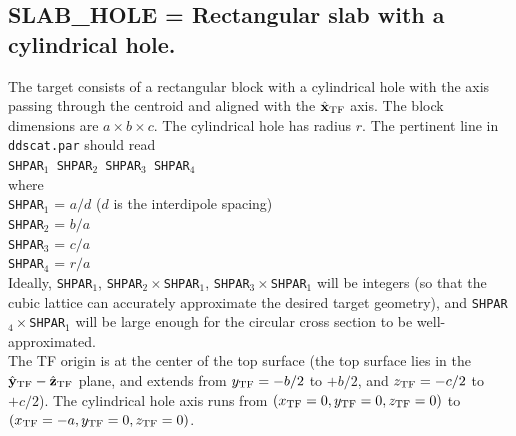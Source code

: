 \subsection{ SLAB\_HOLE = Rectangular slab with a cylindrical hole.
            \label{sec:SLAB_HOLE}}
        The target consists of a rectangular block with a cylindrical
        hole with the axis passing through the centroid and aligned
        with the $\hat{\bf x}_{\rm TF}$ axis.
        The block dimensions are 
        $a\times b\times c$.
        The cylindrical hole has radius $r$. 
        The pertinent line in {\tt ddscat.par} should read\\
        {\tt SHPAR$_1$ SHPAR$_2$ SHPAR$_3$ SHPAR$_4$}\\
        where\\
        {\tt SHPAR$_1$} = $a/d$ ($d$ is the interdipole spacing) \\
        {\tt SHPAR$_2$} = $b/a$ \\
        {\tt SHPAR$_3$} = $c/a$ \\
        {\tt SHPAR$_4$} = $r/a$ \\
        Ideally, {\tt SHPAR}$_1$,
        {\tt SHPAR}$_2\times${\tt SHPAR}$_1$,
        {\tt SHPAR}$_3\times${\tt SHPAR}$_1$ will be integers (so that the
        cubic lattice can accurately approximate the desired target
        geometry), and
        {\tt SHPAR}$_4\times${\tt SHPAR}$_1$ will be large enough for
        the circular cross section to be well-approximated.\\
        The TF origin is at the center of the top surface (the top surface
        lies in the $\hat{\bf y}_{\rm TF}-\hat{\bf z}_{\rm TF}$ plane, and extends from 
        $y_{{\rm TF}}=-b/2$ to $+b/2$,
        and $z_{\rm TF}=-c/2$ to $+c/2$).
        The cylindrical hole axis runs from $(x_{\rm TF}=0,y_{\rm TF}=0,z_{\rm TF}=0)$ to
        $(x_{\rm TF}=-a,y_{\rm TF}=0,z_{\rm TF}=0)$.
